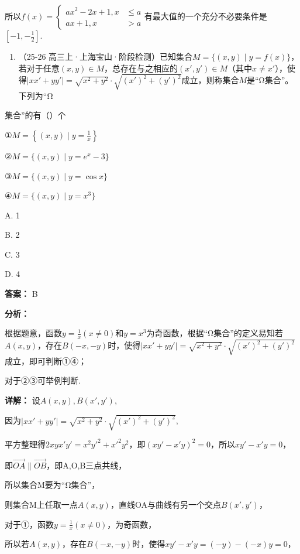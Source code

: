 \documentclass[11pt,a4paper]{ctexart}
\begin{document}
所以\(f(x)=\left\{\begin{aligned}ax^{2}-2x+1,x&\leq a\\ ax+1,x&>a\end{aligned}\right.\)有最大值的一个充分不必要条件是\(\left[-1,-\frac{1}{2}\right]\).

\begin{enumerate}[label=\arabic*., leftmargin=*, start=4]
\item （25-26
  高三上·上海宝山·阶段检测）已知集合\(M = \{(x, y) \mid y = f(x)\}\)，若对于任意\((x, y) \in M\)，总存在与之相应的\((x', y') \in M\)（其中\(x \neq x'\)），使得\(|xx' + yy'| = \sqrt{x^2 + y^2} \cdot \sqrt{(x')^2 + (y')^2}\)成立，则称集合\(M\)是``Ω集合''。下列为``Ω
\end{enumerate}

集合''的有（）个

①\(M=\left\{(x,y)\mid y=\frac{1}{x}\right\}\)

②\(M=\{(x,y)\mid y=e^{x}-3\}\)

③\(M=\{(x,y)\mid y=\cos x\}\)

④\(M=\{(x,y)\mid y=x^{3}\}\)

A. 1

B. 2

C. 3

D. 4

\textbf{答案：}
B

\textbf{分析：}

根据题意，函数\(y = \frac{1}{x} (x \neq 0)\)和\(y = x^3\)为奇函数，根据``Ω集合''的定义易知若\(A(x, y)\)，存在\(B(-x, -y)\)时，使得\(|xx' + yy'| = \sqrt{x^2 + y^2} \cdot \sqrt{(x')^2 + (y')^2}\)成立，即可判断①④；

对于②③可举例判断.

\textbf{详解：}
设\(A(x,y),B(x',y')\),

因为\(|xx' + yy'| = \sqrt{x^2 + y^2} \cdot \sqrt{(x')^2 + (y')^2}\),

平方整理得\(2xyx'y' = x^{2}y'^{2} + x'^{2}y^{2}\)，即\((xy' - x'y)^{2} = 0\)，所以\(xy' - x'y = 0\)，

即\(\overrightarrow{OA} \parallel \overrightarrow{OB}\)，即A,O,B三点共线，

所以集合M要为``Ω集合''，

则集合M上任取一点\(A(x,y)\)，直线OA与曲线有另一个交点\(B(x',y')\)，

对于①，函数\(y = \frac{1}{x} (x \neq 0)\)，为奇函数，

所以若\(A(x,y)\)，存在\(B(-x,-y)\)时，使得\(xy'-x'y=(-y)-(-x)y=0\)，
\end{document}
